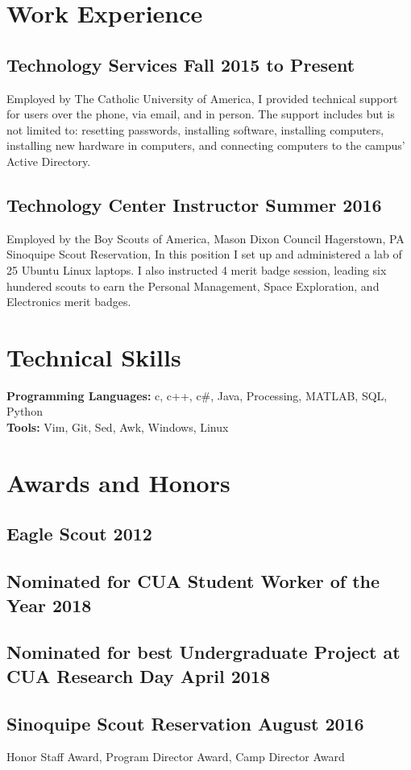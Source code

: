 \documentclass{article}
\begin{document}
\section{Work Experience}
\subsection{Technology Services \hfill Fall 2015 to Present}
Employed by The Catholic University of America,
I provided technical support for users over the phone, via email, and in person.
The support includes but is not limited to:
resetting passwords,
installing software,
installing computers,
installing new hardware in computers,
and
connecting computers to the campus' Active Directory.

\subsection{Technology Center Instructor \hfill Summer 2016}
Employed by the Boy Scouts of America, Mason Dixon Council Hagerstown, PA Sinoquipe Scout Reservation,
In this position I set up and administered a lab of 25 Ubuntu Linux laptops.
I also instructed 4 merit badge session, leading six hundered scouts to earn the
Personal Management,
Space Exploration,
and
Electronics
merit badges.

\section{Technical Skills}
\textbf{Programming Languages:}
c,
c++,
c\#,
Java,
Processing,
MATLAB,
SQL,
Python \\
\textbf{Tools:}
Vim,
Git,
Sed,
Awk,
Windows,
Linux

\section{Awards and Honors}
\subsection{Eagle Scout \hfill 2012}
\subsection{Nominated for CUA Student Worker of the Year \hfill 2018}
\subsection{Nominated for best Undergraduate Project at CUA Research Day \hfill April 2018}
\subsection{Sinoquipe Scout Reservation \hfill August 2016}
Honor Staff Award, Program Director Award, Camp Director Award
\end{document}
